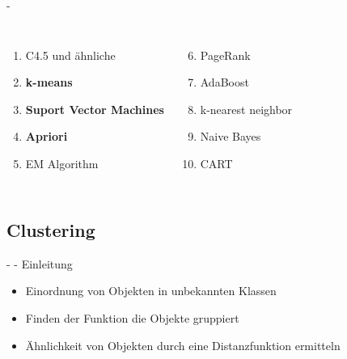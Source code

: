\documentclass[fleqn,11pt,aspectratio=43]{beamer}
\begin{document}
\begin{frame}{\insertsectionhead - \insertsubsectionhead\cite{wu2008top}}
\begin{columns}[onlytextwidth]
		\begin{enumerate}
		\item C4.5 und ähnliche
		\item \textbf{k-means}
		\item \textbf{Suport Vector Machines}
		\item \textbf{Apriori}
		\item EM Algorithm
		\end{enumerate}
	    \begin{enumerate}
	    \setcounter{enumi}{5}
	    \item PageRank
	    \item AdaBoost
	    \item k-nearest neighbor
	    \item Naive Bayes
	    \item CART
	    \end{enumerate}
\end{columns}
\end{frame}

%

\subsection{Clustering~}

\begin{frame}{\insertsectionhead - \insertsubsectionhead - Einleitung\cite{ester2000knowledge}}
\begin{itemize}
\item Einordnung von Objekten in unbekannten Klassen
\item Finden der Funktion die Objekte gruppiert
\item Ähnlichkeit von Objekten durch eine Distanzfunktion ermitteln
\end{itemize}
\end{frame}
\end{document}
